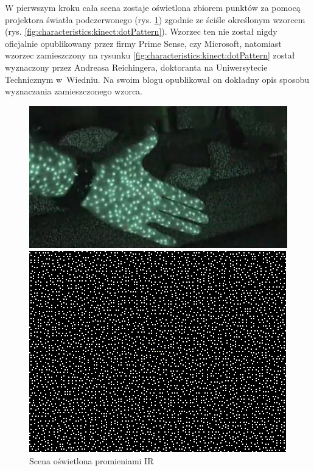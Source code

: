 W pierwszym kroku cała scena zostaje oświetlona zbiorem punktów za pomocą projektora światła podczerwonego (rys. \ref{fig:characteristics:kinect:nightVision}) zgodnie ze ściśle określonym wzorcem (rys. \ref{fig:characteristics:kinect:dotPattern}). Wzorzec ten nie został nigdy oficjalnie opublikowany przez firmy Prime Sense, czy Microsoft, natomiast wzorzec zamieszczony na rysunku \ref{fig:characteristics:kinect:dotPattern} został wyznaczony przez Andreasa Reichingera, doktoranta na Uniwersytecie Technicznym w~Wiedniu. Na swoim blogu opublikował on dokładny opis sposobu wyznaczania zamieszczonego wzorca.
																															
\begin{savenotes}
	\begin{figure}[!htb]
		\centering
		\begin{minipage}[b]{0.48\linewidth}
			\centering   
			\includegraphics[width=\textwidth]{images/kinectNightVision.jpg}	
			\caption[Scena oświetlona promieniami podczerwonymi]{Scena oświetlona promieniami IR}
			\label{fig:characteristics:kinect:nightVision}
		\end{minipage}
		\hfill
		\begin{minipage}[b]{0.48\linewidth}
			\centering 
			\includegraphics[width=\textwidth]{images/kinect-pattern_3x3.png}

\end{minipage}
\end{figure}
\end{savenotes}
